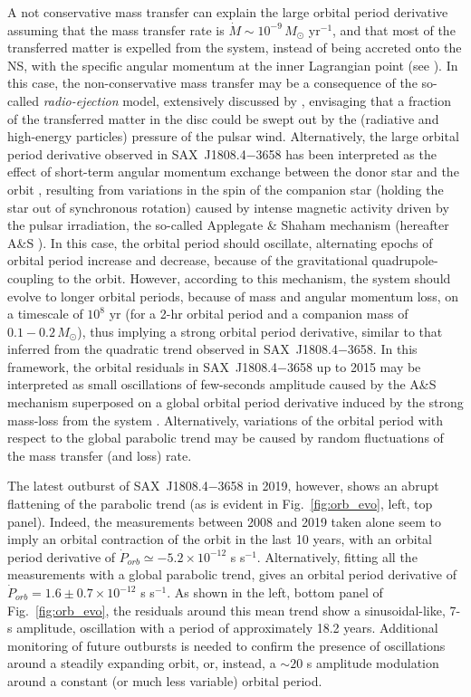 \documentclass[graybox]{svmult}
\def \saxj{{\rm SAX~J1808.4$-$3658\xspace}}
\begin{document}
A not conservative mass transfer can explain the large orbital period derivative assuming that the mass transfer rate is $\dot M \sim 10^{-9}\, M_\odot$ yr$^{-1}$, and that most of the transferred matter is expelled from the system, instead of being accreted onto the NS, with the specific angular momentum at the inner Lagrangian point (see \cite{DiSalvo2008,Burderi2009}). In this case, the non-conservative mass transfer may be a consequence of the so-called \textit{radio-ejection} model, extensively discussed by \cite{Burderi2001}, envisaging that a fraction of the transferred matter in the disc could be swept out by the (radiative and high-energy particles) pressure of the pulsar wind. Alternatively, the large orbital period derivative observed in \saxj{} has been interpreted as the effect of short-term angular momentum exchange between the donor star and the orbit \cite{Hartman2009b,Patruno2012b}, resulting from variations in the spin of the companion star (holding the star out of synchronous rotation) caused by intense magnetic activity driven by the pulsar irradiation, the so-called Applegate \& Shaham mechanism (hereafter A\&S \cite{Applegate1994}). In this case, the orbital period should oscillate, alternating epochs of orbital period increase and decrease, because of the gravitational quadrupole-coupling to the orbit. However, according to this mechanism, the system should evolve to longer orbital periods, because of mass and angular momentum loss, on a timescale of $10^8$ yr (for a 2-hr orbital period and a companion mass of $0.1-0.2\, M_\odot$), thus implying a strong orbital period derivative, similar to that inferred from the quadratic trend observed in \saxj{}. In this framework, the orbital residuals in \saxj{} up to 2015 may be interpreted as small oscillations of few-seconds amplitude caused by the A\&S mechanism superposed on a global orbital period derivative induced by the strong mass-loss from the system \cite{Sanna2017c}. Alternatively, variations of the orbital period with respect to the global parabolic trend may be caused by random fluctuations of the mass transfer (and loss) rate. 

The latest outburst of \saxj{} in 2019, however, shows an abrupt flattening of the parabolic trend \cite{Bult2019c} (as is evident in Fig.~\ref{fig:orb_evo}, left, top panel). Indeed, the measurements between 2008 and 2019 taken alone seem to imply an orbital contraction of the orbit in the last 10 years, with an orbital period derivative of $\dot P_{orb} \simeq -5.2 \times 10^{-12}$ s s$^{-1}$. Alternatively, fitting all the measurements with a global parabolic trend, gives an orbital period derivative of $\dot P_{orb} = 1.6 \pm 0.7 \times 10^{-12}$ s s$^{-1}$. As shown in the left, bottom panel of Fig.~\ref{fig:orb_evo}, the residuals around this mean trend show a sinusoidal-like, 7-s amplitude, oscillation with a period of approximately 18.2 years. Additional monitoring of future outbursts is needed to confirm the presence of oscillations around a steadily expanding orbit, or, instead, a $\sim 20$ s amplitude modulation around a constant (or much less variable) orbital period.
\end{document}
